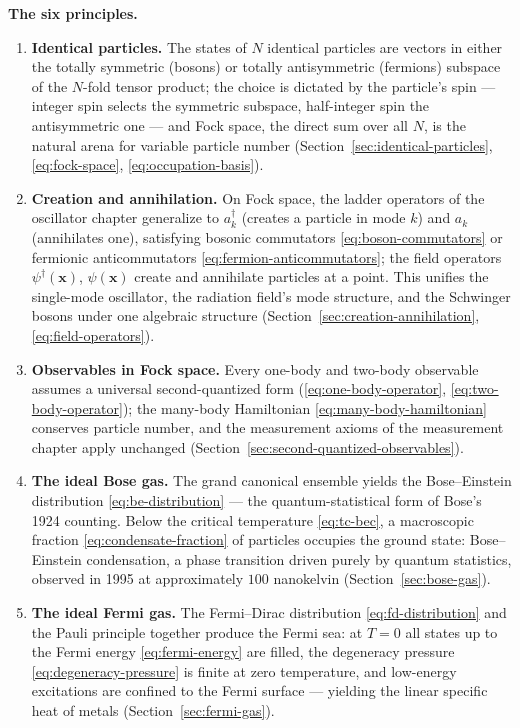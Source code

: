 \medskip\noindent\textbf{The six principles.}

\begin{enumerate}
    \item[(Q1)] \textbf{Identical particles.} The states of $N$ identical particles are vectors in either the totally symmetric (bosons) or totally antisymmetric (fermions) subspace of the $N$-fold tensor product; the choice is dictated by the particle's spin --- integer spin selects the symmetric subspace, half-integer spin the antisymmetric one --- and Fock space, the direct sum over all $N$, is the natural arena for variable particle number (Section~\ref{sec:identical-particles}, \eqref{eq:fock-space}, \eqref{eq:occupation-basis}).

    \item[(Q2)] \textbf{Creation and annihilation.} On Fock space, the ladder operators of the oscillator chapter generalize to $a_k^\dagger$ (creates a particle in mode $k$) and $a_k$ (annihilates one), satisfying bosonic commutators \eqref{eq:boson-commutators} or fermionic anticommutators \eqref{eq:fermion-anticommutators}; the field operators $\psi^\dagger(\bm x)$, $\psi(\bm x)$ create and annihilate particles at a point. This unifies the single-mode oscillator, the radiation field's mode structure, and the Schwinger bosons under one algebraic structure (Section~\ref{sec:creation-annihilation}, \eqref{eq:field-operators}).

    \item[(Q3)] \textbf{Observables in Fock space.} Every one-body and two-body observable assumes a universal second-quantized form (\eqref{eq:one-body-operator}, \eqref{eq:two-body-operator}); the many-body Hamiltonian \eqref{eq:many-body-hamiltonian} conserves particle number, and the measurement axioms of the measurement chapter apply unchanged (Section~\ref{sec:second-quantized-observables}).

    \item[(Q4)] \textbf{The ideal Bose gas.} The grand canonical ensemble yields the Bose--Einstein distribution \eqref{eq:be-distribution} --- the quantum-statistical form of Bose's 1924 counting. Below the critical temperature \eqref{eq:tc-bec}, a macroscopic fraction \eqref{eq:condensate-fraction} of particles occupies the ground state: Bose--Einstein condensation, a phase transition driven purely by quantum statistics, observed in 1995 at approximately $100$ nanokelvin (Section~\ref{sec:bose-gas}).

    \item[(Q5)] \textbf{The ideal Fermi gas.} The Fermi--Dirac distribution \eqref{eq:fd-distribution} and the Pauli principle together produce the Fermi sea: at $T = 0$ all states up to the Fermi energy \eqref{eq:fermi-energy} are filled, the degeneracy pressure \eqref{eq:degeneracy-pressure} is finite at zero temperature, and low-energy excitations are confined to the Fermi surface --- yielding the linear specific heat of metals (Section~\ref{sec:fermi-gas}).


\end{enumerate}
